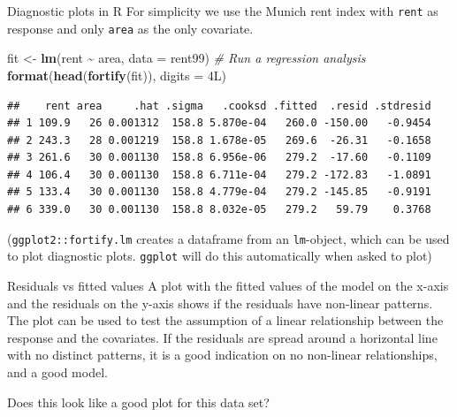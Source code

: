 \documentclass[
  ignorenonframetext,
]{beamer}
\newenvironment{Shaded}{\begin{snugshade}}{\end{snugshade}}
\newcommand{\AttributeTok}[1]{\textcolor[rgb]{0.13,0.29,0.53}{#1}}
\newcommand{\CommentTok}[1]{\textcolor[rgb]{0.56,0.35,0.01}{\textit{#1}}}
\newcommand{\DataTypeTok}[1]{\textcolor[rgb]{0.13,0.29,0.53}{#1}}
\newcommand{\DecValTok}[1]{\textcolor[rgb]{0.00,0.00,0.81}{#1}}
\newcommand{\FunctionTok}[1]{\textcolor[rgb]{0.13,0.29,0.53}{\textbf{#1}}}
\newcommand{\NormalTok}[1]{#1}
\newcommand{\OtherTok}[1]{\textcolor[rgb]{0.56,0.35,0.01}{#1}}
\newcommand{\SpecialCharTok}[1]{\textcolor[rgb]{0.81,0.36,0.00}{\textbf{#1}}}
\begin{document}
\begin{frame}[fragile]
\begin{block}{Diagnostic plots in R}
\protect{}\label{diagnostic-plots-in-r}
For simplicity we use the Munich rent index with \texttt{rent} as
response and only \texttt{area} as the only covariate.

\footnotesize

\begin{Shaded}
\begin{Highlighting}[]
\NormalTok{fit }\OtherTok{\textless{}{-}} \FunctionTok{lm}\NormalTok{(rent }\SpecialCharTok{\textasciitilde{}}\NormalTok{ area, }\AttributeTok{data =}\NormalTok{ rent99)  }\CommentTok{\# Run a regression analysis}
\FunctionTok{format}\NormalTok{(}\FunctionTok{head}\NormalTok{(}\FunctionTok{fortify}\NormalTok{(fit)), }\AttributeTok{digits =} \DecValTok{4}\DataTypeTok{L}\NormalTok{)}
\end{Highlighting}
\end{Shaded}

\begin{verbatim}
##    rent area     .hat .sigma   .cooksd .fitted  .resid .stdresid
## 1 109.9   26 0.001312  158.8 5.870e-04   260.0 -150.00   -0.9454
## 2 243.3   28 0.001219  158.8 1.678e-05   269.6  -26.31   -0.1658
## 3 261.6   30 0.001130  158.8 6.956e-06   279.2  -17.60   -0.1109
## 4 106.4   30 0.001130  158.8 6.711e-04   279.2 -172.83   -1.0891
## 5 133.4   30 0.001130  158.8 4.779e-04   279.2 -145.85   -0.9191
## 6 339.0   30 0.001130  158.8 8.032e-05   279.2   59.79    0.3768
\end{verbatim}

(\texttt{ggplot2::fortify.lm} creates a dataframe from an
\texttt{lm}-object, which can be used to plot diagnostic plots.
\texttt{ggplot} will do this automatically when asked to plot)
\end{block}
\end{frame}

\begin{frame}
\begin{block}{Residuals vs fitted values}
\protect{}\label{residuals-vs-fitted-values}
A plot with the fitted values of the model on the x-axis and the
residuals on the y-axis shows if the residuals have non-linear patterns.
The plot can be used to test the assumption of a linear relationship
between the response and the covariates. If the residuals are spread
around a horizontal line with no distinct patterns, it is a good
indication on no non-linear relationships, and a good model.

Does this look like a good plot for this data set?
\end{block}
\end{frame}
\end{document}
